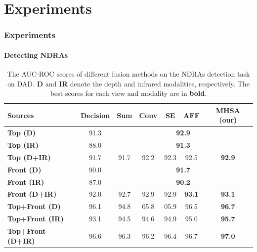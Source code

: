 \section{Experiments}

\begin{frame}
\frametitle{Experiments}
\framesubtitle{Detecting NDRAs}

\begin{table}[]
\begin{tabular}{l|cccccc}
\hline
\textbf{Sources} & \textbf{Decision} \cite{kopuklu2021driver} & \textbf{Sum} & \textbf{Conv} & \textbf{SE} & \textbf{AFF} & \textbf{MHSA (our)} \\ \hline
\textbf{Top (D)}          & 91.3 & \multicolumn{5}{c}{\textbf{92.9}}                  \\
\textbf{Top (IR)}         & 88.0 & \multicolumn{5}{c}{\textbf{91.3}}                  \\
\textbf{Top (D+IR)}       & 91.7 & 91.7 & 92.2 & 92.3 & 92.5          & \textbf{92.9} \\ \hline
\textbf{Front (D)}        & 90.0 & \multicolumn{5}{c}{\textbf{91.7}}                  \\
\textbf{Front (IR)}       & 87.0 & \multicolumn{5}{c}{\textbf{90.2}}                  \\
\textbf{Front (D+IR)}     & 92.0 & 92.7 & 92.9 & 92.9 & \textbf{93.1} & \textbf{93.1} \\ \hline
\textbf{Top+Front (D)}    & 96.1 & 94.8 & 05.8 & 05.9 & 96.5          & \textbf{96.7} \\
\textbf{Top+Front (IR)}   & 93.1 & 94.5 & 94.6 & 94.9 & 95.0          & \textbf{95.7} \\
\textbf{Top+Front (D+IR)} & 96.6 & 96.3 & 96.2 & 96.4 & 96.7          & \textbf{97.0} \\ \hline
\end{tabular}
\caption{The AUC-ROC scores of different fusion methods on the NDRAs detection task on DAD. \textbf{D} and \textbf{IR} denote the depth and infrared modalities, respectively. The best scores for each view and modality are in \textbf{bold}.}
\label{tab:1}
\end{table}

\end{frame}

